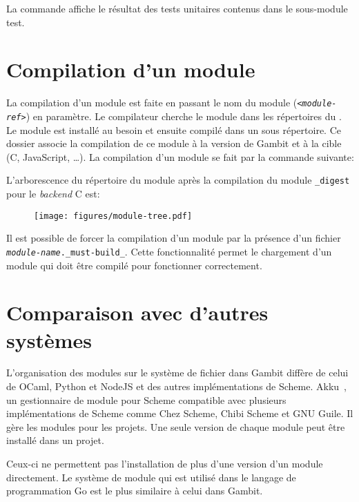 La commande affiche le résultat des tests unitaires contenus dans le
sous-module test.


\section{Compilation d'un module}
%
La compilation d'un module est faite en passant le nom du module
(\texttt{\textit{<module-ref>}}) en paramètre.  Le compilateur cherche le
module dans les répertoires du . Le module est
installé au besoin et ensuite compilé dans un sous répertoire. Ce dossier associe
la compilation de ce module à la version de Gambit et à la cible (C, JavaScript, \dots).
La compilation d'un module se fait par la commande suivante:

\begin{center}
\end{center}

L'arborescence du répertoire du module après la compilation du module
\texttt{\_digest} pour le \textit{backend} C est:
%
\begin{figure}[ht]
  \centering
  \texttt{[image: figures/module-tree.pdf]}
\end{figure}

Il est possible de forcer la compilation d'un module par la présence d'un fichier
\texttt{\textit{module-name}.\_must-build\_}. Cette fonctionnalité permet le chargement d'un
module qui doit être compilé pour fonctionner correctement.


\section{Comparaison avec d'autres systèmes}
L'organisation des modules sur le système de fichier dans Gambit diffère de
celui de OCaml, Python et NodeJS et des autres implémentations de Scheme.
Akku~\cite{Akku.scm}, un gestionnaire de module pour Scheme compatible avec
plusieurs implémentations de Scheme comme Chez Scheme, Chibi Scheme et GNU
Guile. Il gère les modules pour les projets. Une seule version de chaque module
peut être installé dans un projet.

Ceux-ci ne permettent pas l'installation de plus d'une version d'un module
directement. Le système de module qui est utilisé dans le langage de
programmation Go est le plus similaire à celui dans Gambit.

